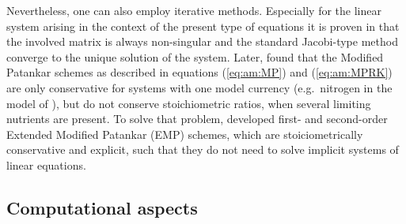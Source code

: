 Nevertheless, one can also employ iterative methods.
Especially for the linear system arising in the context of the present
type of equations it is proven in \cite{Burchardetal2003b}
that the involved matrix is always non-singular and the
standard Jacobi-type method converge to the unique solution of the system.
Later, \cite{Bruggemanetal2005} found that the Modified Patankar
schemes as described in equations (\ref{eq:am:MP}) and (\ref{eq:am:MPRK})
are only conservative for systems with one model currency
(e.g.\ nitrogen in the model of \cite{Fashametal1990}),
but do not conserve stoichiometric ratios, when several
limiting nutrients are present. To solve that problem,
\cite{Bruggemanetal2005} developed first- and second-order
Extended Modified Patankar (EMP) schemes, which are
stoiciometrically conservative and explicit, such that they do
not need to solve implicit systems of linear equations. 


\subsection{Computational aspects}\label{sec:bio-comp}

